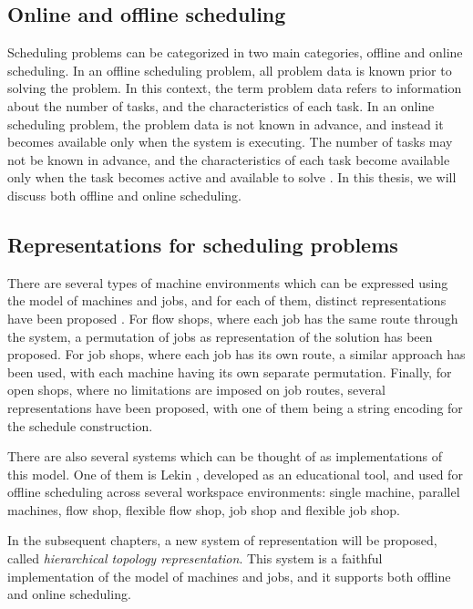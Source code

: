 \subsection{Online and offline scheduling}
\label{sec:offline_and_online_scheduling}
Scheduling problems can be categorized in two main categories, offline and online scheduling. In an offline scheduling problem, all problem data is known prior to solving the problem. In this context, the term problem data refers to information about the number of tasks, and the characteristics of each task. In an online scheduling problem, the problem data is not known in advance, and instead it becomes available only when the system is executing. The number of tasks may not be known in advance, and the characteristics of each task become available only when the task becomes active and available to solve \citep{pinedo2016scheduling}. In this thesis, we will discuss both offline and online scheduling.

\subsection{Representations for scheduling problems}
\label{sec:representations_for_scheduling_problems}
There are several types of machine environments which can be expressed using the model of machines and jobs, and for each of them, distinct representations have been proposed \citep{werner2013survey}. For flow shops, where each job has the same route through the system, a permutation of jobs as representation of the solution has been proposed. For job shops, where each job has its own route, a similar approach has been used, with each machine having its own separate permutation. Finally, for open shops, where no limitations are imposed on job routes, several representations have been proposed, with one of them being a string encoding for the schedule construction.

There are also several systems which can be thought of as implementations of this model. One of them is Lekin \citep{lekin}, developed as an educational tool, and used for offline scheduling across several workspace environments: single machine, parallel machines, flow shop, flexible flow shop, job shop and flexible job shop.

In the subsequent chapters, a new system of representation will be proposed, called \textit{hierarchical topology representation}. This system is a faithful implementation of the model of machines and jobs, and it supports both offline and online scheduling.